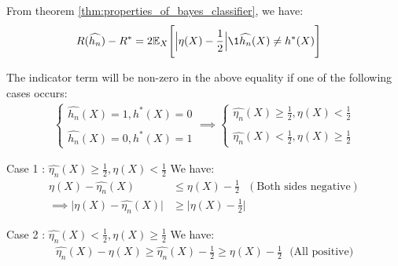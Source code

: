 \begin{proof*}
    From theorem \ref{thm:properties_of_bayes_classifier}, we have:
    \begin{align*}
        R(\widehat{h_n}) - R^* &= 2\mathbb{E}_X\Bigg[ \Big| \eta(X) - \frac{1}{2}\Big|\1{\widehat{h_n}(X)\ne h^*(X)}\Bigg]
    \end{align*}

    \noindent The indicator term will be non-zero in the above equality if one of the following cases occurs:
    \begin{align*}
        \begin{cases}
            \widehat{h_n}(X) = 1, h^*(X) = 0
            \\ \\
            \widehat{h_n}(X) = 0, h^*(X) = 1
        \end{cases}
        \implies 
        \begin{cases}
            \widehat{\eta_n}(X) \ge \frac{1}{2}, \eta(X) < \frac{1}{2}
            \\ \\
            \widehat{\eta_n}(X) < \frac{1}{2}, \eta(X) \ge \frac{1}{2}
        \end{cases}
    \end{align*}

    \begin{subproof}{\newline Case 1 : $\widehat{\eta_n}(X) \ge \frac{1}{2}, \eta(X) < \frac{1}{2}$}
        We have:
        \begin{align*}
            \eta(X) - \widehat{\eta_n}(X) &\le \eta(X) - \frac{1}{2} \ \ \ (\text{Both sides negative}) \\
            \implies \Bigg| \eta(X) - \widehat{\eta_n}(X) \Bigg| &\ge \Bigg| \eta(X) - \frac{1}{2} \Bigg|
        \end{align*}
    \end{subproof}

    \begin{subproof}{\newline Case 2 : $\widehat{\eta_n}(X) < \frac{1}{2}, \eta(X) \ge \frac{1}{2}$}
        We have:
        \begin{align*}
            \widehat{\eta_n}(X) - \eta(X) \ge \widehat{\eta_n}(X) - \frac{1}{2} \ge  \eta(X) - \frac{1}{2} \ \ \ \text{(All positive)}
        \end{align*}


\end{subproof}
\end{proof*}

